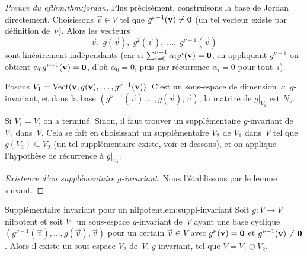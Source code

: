 \begin{proof}[Preuve du 
ef{thm:thm:jordan}]
  Plus précisément, construisons la base de Jordan directement.
  Choisissons $\vec{v}\in V$ tel que $g^{\nu-1}(\mathbf{v})\neq\mathbf{0}$
  (un tel vecteur existe par définition de~$\nu$). Alors les vecteurs
  \[
    \vec{v},\;g(\vec{v}),\;g^2(\vec{v}),\;\ldots,\;g^{\nu-1}(\vec{v})
  \]
  sont linéairement indépendants (car si
  $\sum_{i=0}^{\nu-1}\alpha_i g^i(\mathbf{v})=\mathbf{0}$, en appliquant
  $g^{\nu-1}$ on obtient $\alpha_0 g^{\nu-1}(\mathbf{v})=\mathbf{0}$, d'où
  $\alpha_0=0$, puis par récurrence $\alpha_i=0$ pour tout~$i$).

  Posons $V_1=\operatorname{Vect}(\mathbf{v},g(\mathbf{v}),\ldots,g^{\nu-1}(\mathbf{v}))$.
  C'est un sous-espace de dimension~$\nu$, $g$-invariant, et dans la base
  $(g^{\nu-1}(\vec{v}),\ldots,g(\vec{v}),\vec{v})$, la matrice de $g|_{V_1}$
  est $N_\nu$.

  Si $V_1=V$, on a terminé. Sinon, il faut trouver un supplémentaire
  $g$-invariant de $V_1$ dans~$V$. Cela se fait en choisissant un
  supplémentaire $V_2$ de $V_1$ dans~$V$ tel que $g(V_2)\subseteq V_2$
  (un tel supplémentaire existe, voir ci-dessous), et on applique
  l'hypothèse de récurrence à $g|_{V_2}$.

  \emph{Existence d'un supplémentaire $g$-invariant.} Nous l'établissons
  par le lemme suivant.
\end{proof}

\begin{lemma}{Supplémentaire invariant pour un nilpotent}{lem:suppl-invariant}
  Soit $g\colon V\to V$ nilpotent et soit $V_1$ un sous-espace
  $g$-invariant de~$V$ ayant une base cyclique
  $(g^{\nu-1}(\vec{v}),\ldots,g(\vec{v}),\vec{v})$ pour un certain
  $\vec{v}\in V$ avec $g^\nu(\mathbf{v})=\mathbf{0}$ et
  $g^{\nu-1}(\mathbf{v})\neq\mathbf{0}$. Alors il existe un sous-espace $V_2$
  de~$V$, $g$-invariant, tel que $V=V_1\oplus V_2$.
\end{lemma}

